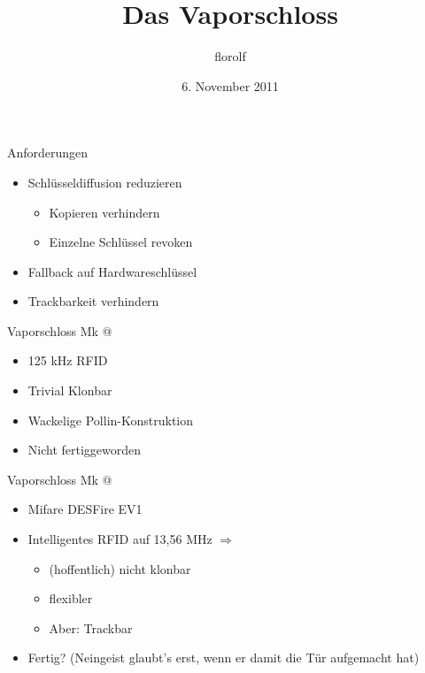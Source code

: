 \documentclass{beamer}
\title{Das Vaporschloss}
\author{florolf}
\institute{Entropia}
\date{6. November 2011}
\makeatletter
\newcommand{\Rmnum}[1]{\expandafter\@slowromancap\romannumeral #1@}
\makeatother
\begin{document}
\begin{frame}
  \titlepage
\end{frame}

\begin{frame}{Anforderungen}
  \begin{itemize}
  \item Schl\"usseldiffusion reduzieren
    \begin{itemize}
    \item Kopieren verhindern
    \item Einzelne Schl\"ussel revoken
    \end{itemize}
  \item Fallback auf Hardwareschl\"ussel
  \item Trackbarkeit verhindern
  \end{itemize}
\end{frame}

\begin{frame}{Vaporschloss Mk \Rmnum{1}}
  \begin{itemize}
  \item 125 kHz RFID
  \item Trivial Klonbar
  \item Wackelige Pollin-Konstruktion
  \item Nicht fertiggeworden
  \end{itemize}
\end{frame}

\begin{frame}{Vaporschloss Mk \Rmnum{2}}
  \begin{itemize}
  \item Mifare DESFire EV1
    \item Intelligentes RFID auf 13,56 MHz
      $\Rightarrow$
      \begin{itemize}
      \item (hoffentlich) nicht klonbar
      \item flexibler
      \item Aber: Trackbar
    \end{itemize}
  \item Fertig? (Neingeist glaubt's erst, wenn er damit die T\"ur
    aufgemacht hat)
  \end{itemize}
\end{frame}
\end{document}
